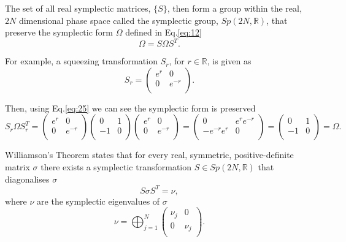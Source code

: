 \documentclass[11pt,a4paper]{article}
\numberwithin{equation}{section}
\begin{document}
	The set of all real symplectic matrices, $\{S\}$, then form a group within the real, $2N$ dimensional phase space called the symplectic group, $Sp(2N, \mathbb{R})$, that preserve the symplectic form $\Omega$ defined in Eq.\ref{eq:12}
	\begin{equation} \label{eq:25}
	\Omega = S\Omega S^T .
	\end{equation}
	
	For example, a squeezing transformation $S_r$, for $r \in \mathbb{R}$, is given as
	\begin{equation*}
	S_r = \begin{pmatrix}
	e^r & 0  \\
	0 & e^{-r} \\
	\end{pmatrix}.
	\end{equation*}
	
	Then, using Eq.\ref{eq:25} we can see the symplectic form is preserved
	\begin{equation*}
	S_r\Omega S_r^{T} = \begin{pmatrix}
	e^r & 0  \\
	0 & e^{-r} \\
	\end{pmatrix}
	\begin{pmatrix}
	0 & 1  \\
	-1 & 0 \\
	\end{pmatrix}
	\begin{pmatrix}
	e^r & 0  \\
	0 & e^{-r} \\
	\end{pmatrix}  = \begin{pmatrix}
	0 & e^re^{-r}  \\
	-e^{-r}e^r & 0 \\
	\end{pmatrix} = \begin{pmatrix}
	0 & 1 \\
	-1 & 0 \\
	\end{pmatrix} = \Omega .
	\end{equation*}
	
	Williamson's Theorem \cite{Williamson36} states that for every real, symmetric, positive-definite matrix  $\sigma$ there exists a symplectic transformation $S \in Sp(2N, \mathbb{R})$ that diagonalises $\sigma$
	\begin{equation} \label{eq:27}
	S\sigma S^T = \nu,
	\end{equation}
	where $\nu$ are the symplectic eigenvalues of $\sigma$ 
	\begin{equation} \label{eq:28}
	\nu = \bigoplus_{j=1}^{N} 
	\begin{pmatrix}
	\nu_j & 0  \\
	0 & \nu_j \\
	\end{pmatrix}.
	\end{equation}
	
\end{document}
